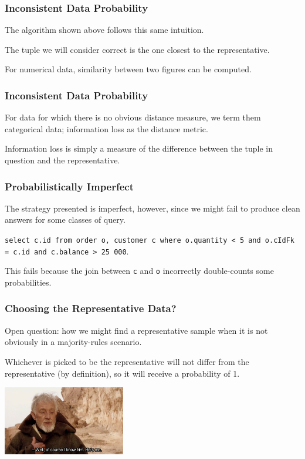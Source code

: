 \begin{frame}
\frametitle{Inconsistent Data Probability}

The algorithm shown above follows this same intuition. 

The tuple we will consider correct is the one closest to the representative. 

For numerical data, similarity between two figures can be computed. 

\end{frame}


\begin{frame}
\frametitle{Inconsistent Data Probability}

For data for which there is no obvious distance measure, we term them \alert{categorical data}; information loss as the distance metric.

Information loss is simply a measure of the difference between  the tuple in question and the representative. 

\end{frame}

\begin{frame}
\frametitle{Probabilistically  Imperfect}

The strategy presented is imperfect, however, since we might fail to produce clean answers for some classes of query.

\texttt{select c.id from order o, customer c  where o.quantity < 5 and o.cIdFk = c.id and c.balance > 25~000}. 

This fails because the join between \texttt{c} and \texttt{o} incorrectly double-counts some probabilities.

\end{frame}


\begin{frame}
\frametitle{Choosing the Representative Data?}

Open question: how we might find a representative sample when it is not obviously in a majority-rules scenario.

Whichever is picked to be the representative will not differ from the representative (by definition), so it will receive a probability of 1. 

\begin{center}
	\includegraphics[width=0.4\textwidth]{images/hesme.jpg}
\end{center}

\end{frame}


